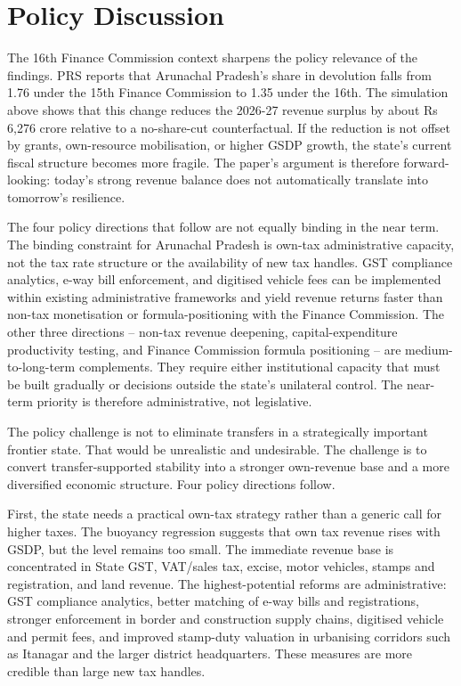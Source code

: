 \documentclass[11pt,a4paper]{article}
\begin{document}
\section{Policy Discussion}

The 16th Finance Commission context sharpens the policy relevance of the findings. PRS reports that Arunachal Pradesh's share in devolution falls from 1.76 under the 15th Finance Commission to 1.35 under the 16th. The simulation above shows that this change reduces the 2026-27 revenue surplus by about Rs 6,276 crore relative to a no-share-cut counterfactual. If the reduction is not offset by grants, own-resource mobilisation, or higher GSDP growth, the state's current fiscal structure becomes more fragile. The paper's argument is therefore forward-looking: today's strong revenue balance does not automatically translate into tomorrow's resilience.

The four policy directions that follow are not equally binding in the near term. The binding constraint for Arunachal Pradesh is own-tax administrative capacity, not the tax rate structure or the availability of new tax handles. GST compliance analytics, e-way bill enforcement, and digitised vehicle fees can be implemented within existing administrative frameworks and yield revenue returns faster than non-tax monetisation or formula-positioning with the Finance Commission. The other three directions -- non-tax revenue deepening, capital-expenditure productivity testing, and Finance Commission formula positioning -- are medium-to-long-term complements. They require either institutional capacity that must be built gradually or decisions outside the state's unilateral control. The near-term priority is therefore administrative, not legislative.

The policy challenge is not to eliminate transfers in a strategically important frontier state. That would be unrealistic and undesirable. The challenge is to convert transfer-supported stability into a stronger own-revenue base and a more diversified economic structure. Four policy directions follow.

First, the state needs a practical own-tax strategy rather than a generic call for higher taxes. The buoyancy regression suggests that own tax revenue rises with GSDP, but the level remains too small. The immediate revenue base is concentrated in State GST, VAT/sales tax, excise, motor vehicles, stamps and registration, and land revenue. The highest-potential reforms are administrative: GST compliance analytics, better matching of e-way bills and registrations, stronger enforcement in border and construction supply chains, digitised vehicle and permit fees, and improved stamp-duty valuation in urbanising corridors such as Itanagar and the larger district headquarters. These measures are more credible than large new tax handles.
\end{document}
